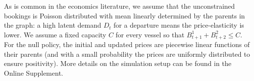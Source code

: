 \documentclass[12pt,a4paper]{article}
\theoremstyle{definition}
\begin{document}



As is common in the economics literature, we assume that the
unconstrained bookings is Poisson distributed with mean linearly determined by
the parents in the graph: a high latent demand $D_t$ for a departure
means the price-elasticity is lower. We assume a fixed capacity $C$
for every vessel so that $B^1_{t+1} + B^2_{t+2} \leq C$. %
For the null policy, the initial and updated prices are piecewise
linear
functions of their parents (and with a small probability the prices are
uniformly distributed to ensure positivity). %
More details on the simulation setup can be found in the Online
Supplement.
\end{document}
